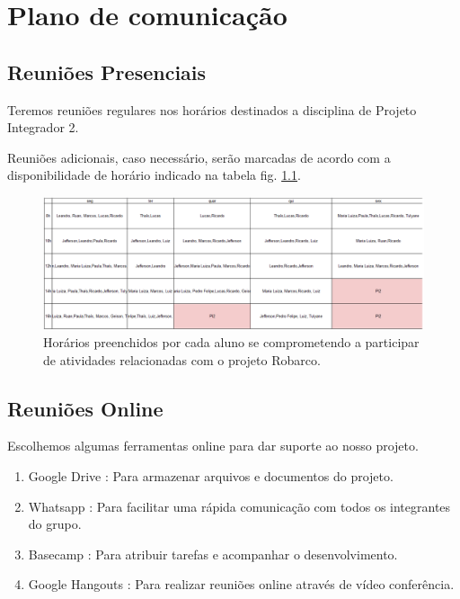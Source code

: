 \chapter[Plano de comunicação]{Plano de comunicação}


\section{Reuniões Presenciais}

Teremos reuniões regulares nos horários destinados a disciplina de Projeto Integrador 2.

Reuniões adicionais, caso necessário, serão marcadas de acordo com a disponibilidade de horário indicado na tabela fig. \ref{horarios}.

 \begin{figure} [!htp]
	\centering
	\includegraphics[scale=0.55]{figuras/horarios}
	\caption{Horários preenchidos por cada aluno se comprometendo a participar de atividades relacionadas com o projeto Robarco.}
	\label{horarios}
\end{figure}

\section{Reuniões Online}

Escolhemos algumas ferramentas online para dar suporte ao nosso projeto.

\begin{enumerate}
	
	\item Google Drive : Para armazenar arquivos e documentos do projeto.
	\item Whatsapp : Para facilitar uma rápida comunicação com todos os integrantes do grupo.
	\item Basecamp : Para atribuir tarefas e acompanhar o desenvolvimento.
	\item Google Hangouts : Para realizar reuniões online através de vídeo conferência. 
	
\end{enumerate}
